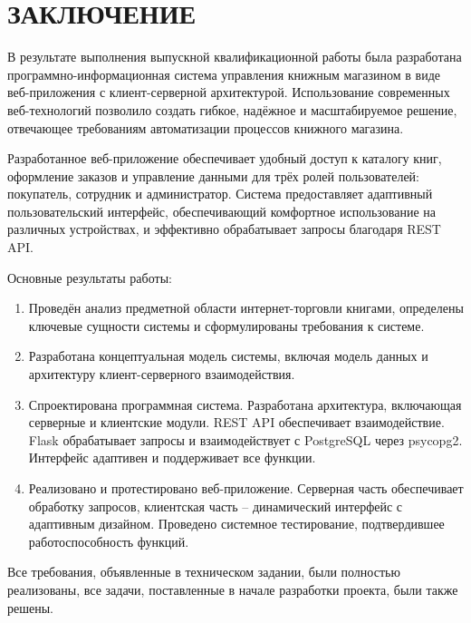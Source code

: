 \section*{ЗАКЛЮЧЕНИЕ}

В результате выполнения выпускной квалификационной работы была разработана программно-информационная система управления книжным магазином в виде веб-приложения с клиент-серверной архитектурой. Использование современных веб-технологий позволило создать гибкое, надёжное и масштабируемое решение, отвечающее требованиям автоматизации процессов книжного магазина.

Разработанное веб-приложение обеспечивает удобный доступ к каталогу книг, оформление заказов и управление данными для трёх ролей пользователей: покупатель, сотрудник и администратор. Система предоставляет адаптивный пользовательский интерфейс, обеспечивающий комфортное использование на различных устройствах, и эффективно обрабатывает запросы благодаря REST API.

Основные результаты работы:

\begin{enumerate}
\item Проведён анализ предметной области интернет-торговли книгами, определены ключевые сущности системы и сформулированы требования к системе.
\item Разработана концептуальная модель системы, включая модель данных и архитектуру клиент-серверного взаимодействия.
\item Спроектирована программная система. Разработана архитектура, включающая серверные и клиентские модули. REST API обеспечивает взаимодействие. Flask обрабатывает запросы и взаимодействует с PostgreSQL через psycopg2. Интерфейс адаптивен и поддерживает все функции.
\item Реализовано и протестировано веб-приложение. Серверная часть обеспечивает обработку запросов, клиентская часть -- динамический интерфейс с адаптивным дизайном. Проведено системное тестирование, подтвердившее работоспособность функций.
\end{enumerate}

Все требования, объявленные в техническом задании, были полностью реализованы, все задачи, поставленные в начале разработки проекта, были также решены.
